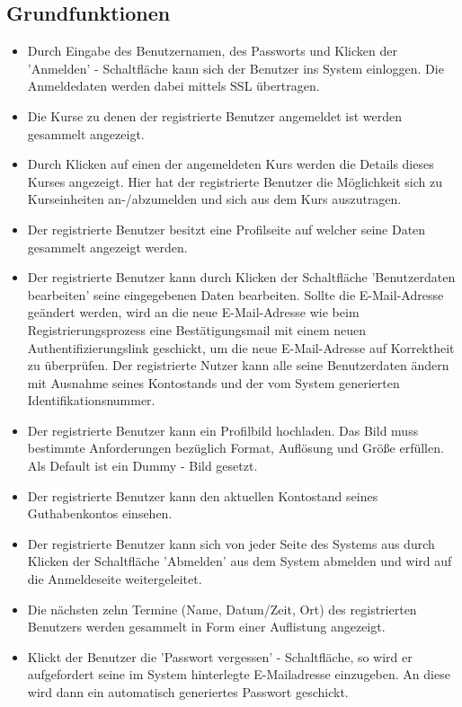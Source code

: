 \documentclass[a4paper]{scrreprt}
\begin{document}
		\subsection{Grundfunktionen}
			\begin{itemize}
				\item {}
					Durch Eingabe des Benutzernamen, des Passworts und Klicken der 'Anmelden' - Schaltfläche kann sich der Benutzer ins System einloggen. Die Anmeldedaten werden dabei mittels \gls{SSL} übertragen.
				\item {}
					Die Kurse zu denen der registrierte Benutzer angemeldet ist werden gesammelt angezeigt.
				\item {}
					Durch Klicken auf einen der angemeldeten Kurs werden die Details dieses Kurses angezeigt. Hier hat der registrierte Benutzer die Möglichkeit sich zu Kurseinheiten an-/abzumelden und sich aus dem Kurs auszutragen.
				\item {}
					Der registrierte Benutzer besitzt eine Profilseite auf welcher seine Daten gesammelt angezeigt werden. 
				\item {}
					Der registrierte Benutzer kann durch Klicken der Schaltfläche 'Benutzerdaten bearbeiten' seine eingegebenen Daten bearbeiten. Sollte die E-Mail-Adresse geändert werden, wird an die neue E-Mail-Adresse wie beim Registrierungsprozess eine Bestätigungsmail mit einem neuen Authentifizierungslink geschickt, um die neue E-Mail-Adresse auf Korrektheit zu überprüfen.
					Der registrierte Nutzer kann alle seine Benutzerdaten ändern mit Ausnahme seines Kontostands und der vom System generierten Identifikationsnummer.
				\item {}
					Der registrierte Benutzer kann ein Profilbild hochladen. Das Bild muss bestimmte Anforderungen bezüglich Format, Auflösung und Größe erfüllen. Als Default ist ein \gls{Dummy} - Bild gesetzt.
				\item {}
					Der registrierte Benutzer kann den aktuellen Kontostand seines Guthabenkontos einsehen. 
				\item {}
					Der registrierte Benutzer kann sich  von jeder Seite des Systems aus durch Klicken der Schaltfläche 'Abmelden' aus dem System abmelden und wird auf die Anmeldeseite weitergeleitet.
				\item {}
					Die nächsten zehn Termine (Name, Datum/Zeit, Ort) des registrierten Benutzers werden gesammelt in Form einer Auflistung angezeigt.
				\item {}
					Klickt der Benutzer die 'Passwort vergessen' - Schaltfläche, so wird er aufgefordert seine im System hinterlegte E-Mailadresse einzugeben. An diese wird dann ein automatisch generiertes Passwort geschickt.
			\end{itemize}	
				
\end{document}
